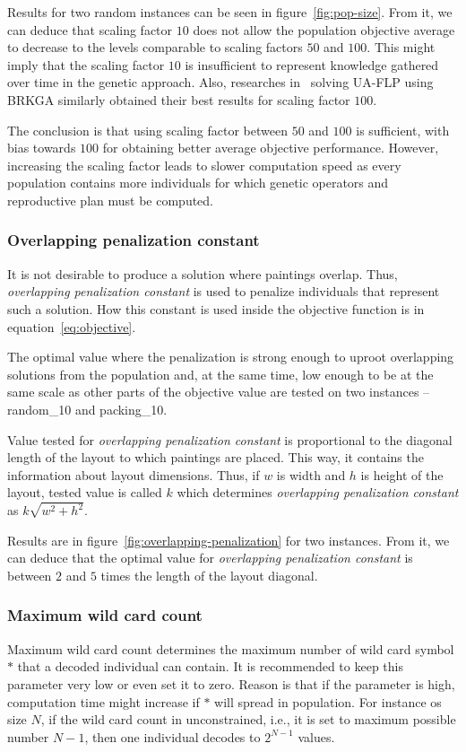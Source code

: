 Results for two random instances can be seen in figure~\ref{fig:pop-size}.
From it, we can deduce that scaling factor $10$ does not allow
the population objective average to decrease to the levels comparable to scaling factors $50$ and $100$.
This might imply that the scaling factor $10$ is insufficient to represent knowledge gathered over time
in the genetic approach.
Also, researches in~\cite{goncalvesBiasedRandomkeyGenetic2015} solving UA-FLP using BRKGA
similarly obtained their best results for scaling factor $100$.

The conclusion is that using scaling factor between $50$ and $100$ is sufficient, with bias towards $100$
for obtaining better average objective performance.
However, increasing the scaling factor leads to slower computation speed as every population contains
more individuals for which genetic operators and reproductive plan must be computed.

\subsubsection*{Overlapping penalization constant}

It is not desirable to produce a solution where paintings overlap.
Thus, \textit{overlapping penalization constant} is used to penalize
individuals that represent such a solution.
How this constant is used inside the objective function is in equation~\ref{eq:objective}.

The optimal value where the penalization is strong enough
to uproot overlapping solutions from the population and, at the same time, low enough
to be at the same scale as other parts of the objective value are tested on two instances – random\_10 and packing\_10.

Value tested for \textit{overlapping penalization constant} is proportional to the diagonal length of the layout to which paintings are placed.
This way, it contains the information about layout dimensions.
Thus, if $w$ is width and $h$ is height of the layout, tested value is called $k$ which determines
\textit{overlapping penalization constant} as $k\sqrt{w^2 + h^2}$.

Results are in figure~\ref{fig:overlapping-penalization} for two instances.
From it, we can deduce that the optimal value for \textit{overlapping penalization constant} is between $2$ and $5$ times the length of the layout diagonal.

\subsubsection*{Maximum wild card count}
Maximum wild card count determines the maximum number of wild card symbol $*$ that a decoded individual can contain.
It is recommended to keep this parameter very low or even set it to zero.
Reason is that if the parameter is high, computation time might increase if $*$ will spread in population.
For instance os size $N$, if the wild card count in unconstrained, i.e., it is set to maximum possible number $N-1$,
then one individual decodes to $2^{N-1}$ values.


